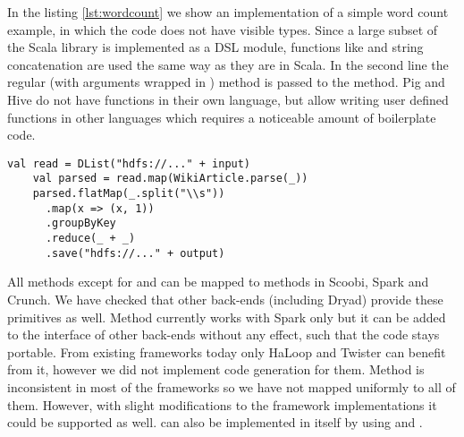 In the listing \ref{lst:wordcount} we show an implementation of a simple word count example, in which the code does not have visible  types. Since a large subset of the Scala library is implemented as a DSL module, functions like  and string concatenation are used the same way as they are in Scala. In the second line the regular (with arguments wrapped in ) method  is passed to the  method. Pig and Hive do not have functions in their own language, but allow writing user defined functions in other languages which requires a noticeable amount of boilerplate code.

\begin{lstlisting}[name=code, caption=Example of word count program where type inference removes the need to declare any \scode{Rep} types., captionpos=b, label=lst:wordcount, float=t]
    val read = DList("hdfs://..." + input)
    val parsed = read.map(WikiArticle.parse(_))
    parsed.flatMap(_.split("\\s"))
      .map(x => (x, 1))
      .groupByKey
      .reduce(_ + _)
      .save("hdfs://..." + output)
\end{lstlisting}

All methods except for  and  can be mapped to methods in Scoobi, Spark and Crunch. We have checked that other back-ends (including Dryad) provide these primitives as well. Method  currently works with Spark only but it can be added to the interface of other back-ends without any effect, such that the code stays portable. From existing frameworks today only HaLoop\cite{bu_haloop:_2010} and Twister \cite{ekanayake_twister:_2010} can benefit from it, however we did not implement code generation for them. Method  is inconsistent in most of the frameworks so we have not mapped uniformly to all of them. However, with slight modifications to the framework implementations it could be supported as well.  can also be implemented in \tool itself by using  and .